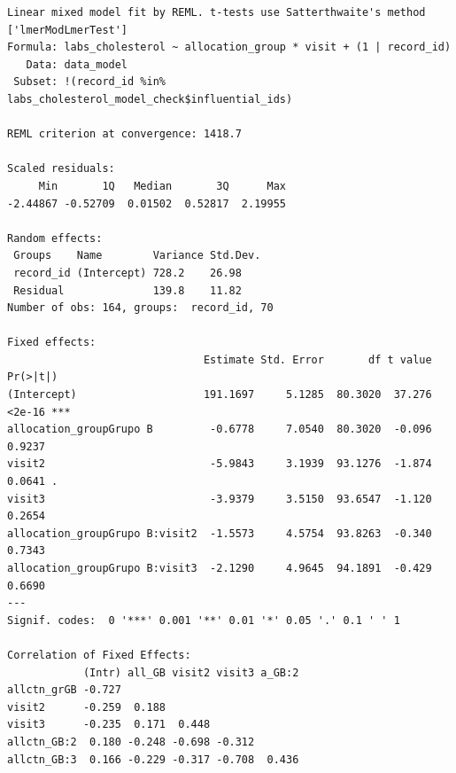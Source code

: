 \documentclass[
  12pt,
]{article}
\newenvironment{Shaded}{\begin{snugshade}}{\end{snugshade}}
\newcommand{\NormalTok}[1]{\textcolor[rgb]{0.00,0.23,0.31}{#1}}
\newcommand{\SpecialCharTok}[1]{\textcolor[rgb]{0.37,0.37,0.37}{#1}}
\begin{document}
\begin{verbatim}
Linear mixed model fit by REML. t-tests use Satterthwaite's method ['lmerModLmerTest']
Formula: labs_cholesterol ~ allocation_group * visit + (1 | record_id)
   Data: data_model
 Subset: !(record_id %in% labs_cholesterol_model_check$influential_ids)

REML criterion at convergence: 1418.7

Scaled residuals: 
     Min       1Q   Median       3Q      Max 
-2.44867 -0.52709  0.01502  0.52817  2.19955 

Random effects:
 Groups    Name        Variance Std.Dev.
 record_id (Intercept) 728.2    26.98   
 Residual              139.8    11.82   
Number of obs: 164, groups:  record_id, 70

Fixed effects:
                               Estimate Std. Error       df t value Pr(>|t|)    
(Intercept)                    191.1697     5.1285  80.3020  37.276   <2e-16 ***
allocation_groupGrupo B         -0.6778     7.0540  80.3020  -0.096   0.9237    
visit2                          -5.9843     3.1939  93.1276  -1.874   0.0641 .  
visit3                          -3.9379     3.5150  93.6547  -1.120   0.2654    
allocation_groupGrupo B:visit2  -1.5573     4.5754  93.8263  -0.340   0.7343    
allocation_groupGrupo B:visit3  -2.1290     4.9645  94.1891  -0.429   0.6690    
---
Signif. codes:  0 '***' 0.001 '**' 0.01 '*' 0.05 '.' 0.1 ' ' 1

Correlation of Fixed Effects:
            (Intr) all_GB visit2 visit3 a_GB:2
allctn_grGB -0.727                            
visit2      -0.259  0.188                     
visit3      -0.235  0.171  0.448              
allctn_GB:2  0.180 -0.248 -0.698 -0.312       
allctn_GB:3  0.166 -0.229 -0.317 -0.708  0.436
\end{verbatim}

\begin{Shaded}
\end{Shaded}
\end{document}
